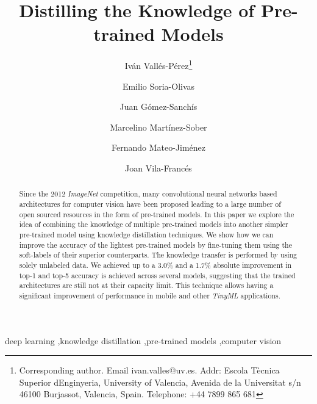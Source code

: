 \documentclass{elsarticle}
\begin{document}
	\begin{frontmatter}
		\title{Distilling the Knowledge of Pre-trained Models}
		\author[UV]{Iván Vallés-Pérez\footnote{Corresponding author. Email ivan.valles@uv.es. Addr: Escola Tècnica Superior d\textsc{}Enginyeria, University of Valencia, Avenida de la Universitat s/n 46100 Burjassot, Valencia, Spain.  Telephone: +44 7899 865 681}}
		\author[UV]{Emilio Soria-Olivas}
		\author[UV]{Juan Gómez-Sanchís}
		\author[UV]{Marcelino Martínez-Sober}%
		\author[UV]{Fernando Mateo-Jiménez}
		\author[UV]{Joan Vila-Francés}
		\address[UV]{Escola Tècnica Superior d\textsc{}Enginyeria, University of Valencia, Avenida de la Universitat s/n 46100 Burjassot, Valencia, Spain. \\ ivan.valles@uv.es, emilio.soria@uv.es, juan.gomez-sanchis@uv.es, marcelino.martinez@uv.es, fernando.mateo@uv.es, joan.vila@uv.es}

		\begin{abstract}
		Since the 2012 \textit{ImageNet} competition, many convolutional neural networks based architectures for computer vision have been proposed leading to a large number of open sourced resources in the form of pre-trained models. In this paper we explore the idea of combining the knowledge of multiple pre-trained models into another simpler pre-trained model using knowledge distillation techniques. We show how we can improve the accuracy of the lightest pre-trained models by fine-tuning them using the soft-labels of their superior counterparts. The knowledge transfer is performed by using solely unlabeled data. We achieved up to a 3.0\% and a 1.7\% absolute improvement in top-1 and top-5 accuracy is achieved across several models, suggesting that the trained architectures are still not at their capacity limit. This technique allows having a significant improvement of performance in mobile and other \textit{TinyML} applications.
		\end{abstract}

		\begin{keyword}
			deep learning \sep knowledge distillation \sep pre-trained models \sep computer vision
		\end{keyword}

	\end{frontmatter}

	\linenumbers
\end{document}
